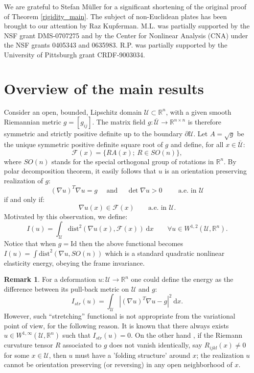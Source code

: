 \documentclass[leqno,twoside, 11pt]{amsart}
\theoremstyle{plain}
\theoremstyle{definition}
\newtheorem{remark}[theorem]{Remark}
\numberwithin{equation}{section}
\numberwithin{figure}{section}
\begin{document}
\bigskip

We are grateful to Stefan M\"uller for a significant shortening of 
the original proof of Theorem \ref{rigidity_main}.
The subject of non-Euclidean plates has been brought to our attention
by Raz Kupferman.
M.L. was partially supported by the NSF grant DMS-0707275
and by the Center for Nonlinear Analysis (CNA) under
the NSF grants 0405343 and 0635983.
R.P. was partially supported by the University of Pittsburgh grant
CRDF-9003034.

\section{Overview of the main results}

Consider an open, bounded, Lipschitz domain
$\mathcal{U}\subset \mathbb{R}^n$, with a given smooth Riemannian 
metric $g = [g_{ij}]$.
The matrix field $g:\bar{\mathcal{U}}\longrightarrow\mathbb{R}^{n\times n}$
is therefore symmetric and strictly positive definite up to the boundary
$\partial\mathcal{U}$.
Let $A=\sqrt{g}$ be the unique symmetric positive definite square root of $g$
and define, for all $x\in\bar{\mathcal U}$:
\begin{equation}\label{setF}
\mathcal{F}(x) = \Big\{RA(x); ~ R\in SO(n)\Big\},
\end{equation}
where $SO(n)$ stands for the special orthogonal group of rotations
in $\mathbb{R}^n$. By polar decomposition theorem, it easily follows that
$u$ is an orientation preserving realization of $g$:
$$(\nabla u)^T\nabla u = g \quad \mbox{ and } \quad \det \nabla u>0
\qquad \mbox{ a.e. in } \mathcal{U}$$
if and only if:
$$\nabla u(x)\in\mathcal{F}(x) \qquad \mbox{a.e. in } \mathcal{U}.$$
Motivated by this observation, we define:
\begin{equation}\label{Icorrect}
I(u)= \int_{\mathcal{U}} \mbox{dist}^2(\nabla u(x), \mathcal{F}(x))~\mbox{d}x
\qquad \forall u\in W^{1,2}(\mathcal{U},\mathbb{R}^n).
\end{equation}
Notice that when $g=\mathrm{Id}$ then the above functional becomes
$I(u) = \int \mbox{dist}^2(\nabla u, SO(n))$ which is a standard quadratic
nonlinear elasticity energy, obeying the frame invariance.

\begin{remark}
For a deformation $u:\mathcal{U}\longrightarrow \mathbb{R}^n$
one could define the energy as the difference between
its pull-back metric on $\mathcal{U}$ and $g$:
\begin{equation*}
I_{str}(u)= \int_{\mathcal{U}} |(\nabla u)^T\nabla u - g|^2 ~\mbox{d}x.
\end{equation*}
However, such ``stretching'' functional is not appropriate
from the variational point of view, for the following reason.
It is known that there always exists
$u\in W^{1,\infty}(\mathcal{U},\mathbb{R}^n)$ such that $I_{str}(u) = 0$.
On the other hand \cite{gromov}, if the Riemann curvature tensor $R$ associated
to $g$ does not vanish identically, say $R_{ijkl}(x)\neq 0$ for some
$x\in\mathcal{U}$, then
$u$ must have a 'folding structure' around $x$; the realization $u$ cannot
be orientation preserving (or reversing) in any open neighborhood of $x$.
\end{remark}
\end{document}

